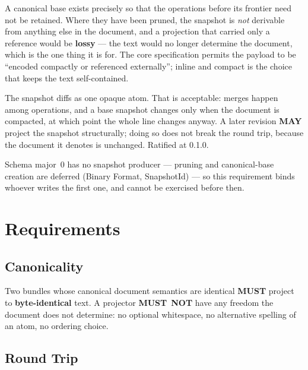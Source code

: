 \documentclass[11pt,letterpaper]{report}
\newcommand{\sectionsc}[1]{{\addfontfeatures{Letters=SmallCaps}#1}}
\newcounter{requirement}[chapter]
\newcommand{\MUST}{\textbf{MUST}}
\newcommand{\MUSTNOT}{\textbf{MUST}\nobreak\ \textbf{NOT}}
\newcommand{\MAY}{\textbf{MAY}}
\begin{document}
\begin{rationale}
  A canonical base exists precisely so that the operations before its frontier
  need not be retained. Where they have been pruned, the snapshot is \emph{not}
  derivable from anything else in the document, and a projection that carried
  only a reference would be \textbf{lossy} --- the text would no longer determine
  the document, which is the one thing it is for. The core specification permits
  the payload to be ``encoded compactly or referenced externally''; inline and
  compact is the choice that keeps the text self-contained.

  The snapshot diffs as one opaque atom. That is acceptable: merges happen among
  operations, and a base snapshot changes only when the document is compacted, at
  which point the whole line changes anyway. A later revision \MAY{} project the
  snapshot structurally; doing so does not break the round trip, because the
  document it denotes is unchanged. Ratified at 0.1.0.

  Schema major~0 has no snapshot producer --- pruning and canonical-base creation
  are deferred (Binary Format, \sectionsc{SnapshotId}) --- so this requirement
  binds whoever writes the first one, and cannot be exercised before then.
\end{rationale}

\chapter{Requirements}
\label{ch:requirements}

\section{Canonicality}

\begin{requirement}
  \label{req:textproj:canonical-text}
  Two bundles whose canonical document semantics are identical \MUST{} project to
  \textbf{byte-identical} text. A projector \MUSTNOT{} have any freedom the
  document does not determine: no optional whitespace, no alternative spelling of
  an atom, no ordering choice.
\end{requirement}

\section{Round Trip}
\end{document}
